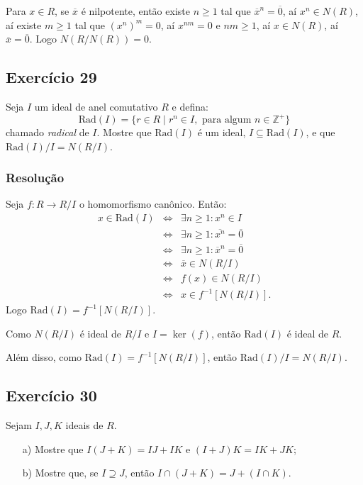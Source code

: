 \documentclass[10pt,a4paper]{article}
\begin{document}
\medskip
\noindent
Para $x\in R$, se $\overline{x}$ é nilpotente, então existe $n\geq 1$ tal que $\overline{x}^n=\overline{0}$, aí $x^n\in N(R)$, aí existe $m\geq 1$ tal que $(x^n)^m=0$, aí $x^{nm}=0$ e $nm\geq 1$, aí $x\in N(R)$, aí $\overline{x}=\overline{0}$. Logo $N(R/N(R))=0$.

\subsection*{Exercício 29}
Seja $I$ um ideal de anel comutativo $R$ e defina:
\[
\mathrm{Rad}(I)=\{r\in R\mid r^n\in I,\text{ para algum }n\in\mathbb{Z}^+\}
\]
chamado \textit{radical} de $I$. Mostre que $\mathrm{Rad}(I)$ é um ideal, $I\subseteq\mathrm{Rad}(I)$, e que $\mathrm{Rad}(I)/I=N(R/I)$.

\subsubsection*{Resolução}

Seja $f:R\rightarrow R/I$ o homomorfismo canônico. Então:
\[
\begin{array}{rcl}
x\in\mathrm{Rad}(I)&\Leftrightarrow&\exists n\geq 1:x^n\in I\\&\Leftrightarrow&\exists n\geq 1:\overline{x^n}=\overline{0}\\&\Leftrightarrow&\exists n\geq 1:\overline{x}^n=\overline{0}\\&\Leftrightarrow&\overline{x}\in N(R/I)\\&\Leftrightarrow&f(x)\in N(R/I)\\&\Leftrightarrow&x\in f^{-1}[N(R/I)].
\end{array}
\]
Logo $\mathrm{Rad}(I)=f^{-1}[N(R/I)]$.

\medskip
\noindent
Como $N(R/I)$ é ideal de $R/I$ e $I=\ker(f)$, então $\mathrm{Rad}(I)$ é ideal de $R$.

\medskip
\noindent
Além disso, como $\mathrm{Rad}(I)=f^{-1}[N(R/I)]$, então $\mathrm{Rad}(I)/I=N(R/I)$.
\subsection*{Exercício 30}
Sejam $I,J,K$ ideais de $R$.
\begin{itemize}
\item[a)] Mostre que $I(J+K)=IJ+IK$ e $(I+J)K=IK+JK$;
\item[b)] Mostre que, se $I\supseteq J$, então $I\cap(J+K)=J+(I\cap K)$.
\end{itemize}
\end{document}
